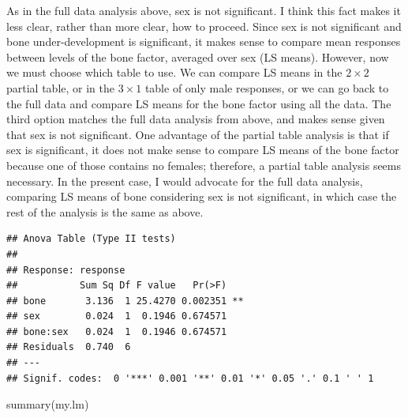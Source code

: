 \documentclass[
]{book}
\newenvironment{Shaded}{\begin{snugshade}}{\end{snugshade}}
\newcommand{\AttributeTok}[1]{\textcolor[rgb]{0.77,0.63,0.00}{#1}}
\newcommand{\DecValTok}[1]{\textcolor[rgb]{0.00,0.00,0.81}{#1}}
\newcommand{\FunctionTok}[1]{\textcolor[rgb]{0.00,0.00,0.00}{#1}}
\newcommand{\NormalTok}[1]{#1}
\newcommand{\OtherTok}[1]{\textcolor[rgb]{0.56,0.35,0.01}{#1}}
\newcommand{\SpecialCharTok}[1]{\textcolor[rgb]{0.00,0.00,0.00}{#1}}
\begin{document}
As in the full data analysis above, sex is not significant. I think this fact makes it less clear, rather than more clear, how to proceed. Since sex is not significant and bone under-development is significant, it makes sense to compare mean responses between levels of the bone factor, averaged over sex (LS means). However, now we must choose which table to use. We can compare LS means in the \(2\times 2\) partial table, or in the \(3\times 1\) table of only male responses, or we can go back to the full data and compare LS means for the bone factor using all the data. The third option matches the full data analysis from above, and makes sense given that sex is not significant. One advantage of the partial table analysis is that if sex is significant, it does not make sense to compare LS means of the bone factor because one of those contains no females; therefore, a partial table analysis seems necessary. In the present case, I would advocate for the full data analysis, comparing LS means of bone considering sex is not significant, in which case the rest of the analysis is the same as above.

\begin{Shaded}
\end{Shaded}

\begin{verbatim}
## Anova Table (Type II tests)
## 
## Response: response
##           Sum Sq Df F value   Pr(>F)   
## bone       3.136  1 25.4270 0.002351 **
## sex        0.024  1  0.1946 0.674571   
## bone:sex   0.024  1  0.1946 0.674571   
## Residuals  0.740  6                    
## ---
## Signif. codes:  0 '***' 0.001 '**' 0.01 '*' 0.05 '.' 0.1 ' ' 1
\end{verbatim}

\begin{Shaded}
\begin{Highlighting}[]
\FunctionTok{summary}\NormalTok{(my.lm)}
\end{Highlighting}
\end{Shaded}
\end{document}
